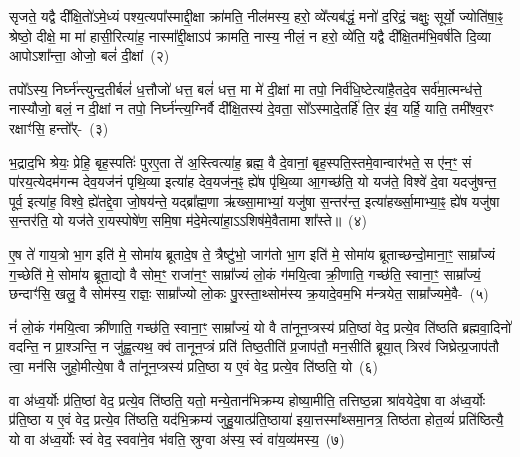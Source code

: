 सृजते॒ यद्वै दी᳚क्षि॒तो॑\-ऽमे॒ध्यं पश्य॒त्यपा᳚स्माद्दी॒क्षा क्रा॑मति॒ नील॑मस्य॒ हरो॒ व्ये᳚त्यब॑द्धं॒ मनो॑ द॒रिद्रं॒ चक्षुः॒ सूर्यो॒ ज्योति॑षा॒ꣴ॒ श्रेष्ठो॒ दीक्षे॒ मा मा॑ हासी॒रित्या॑ह॒ नास्मा᳚द्दी॒क्षा\-ऽप॑ क्रामति॒ नास्य॒ नीलं॒ न हरो॒ व्ये॑ति॒ यद्वै दी᳚क्षि॒तम॑भि॒वर्\mbox{}ष॑ति दि॒व्या आपो\-ऽशा᳚न्ता॒ ओजो॒ बलं॑ दी॒क्षां~(२)

तपो᳚\-ऽस्य॒ निर्घ्न॑न्त्युन्द॒तीर्बलं॑ ध॒त्तौजो॑ धत्त॒ बलं॑ धत्त॒ मा मे॑ दी॒क्षां मा तपो॒ निर्व॑धि॒ष्टेत्या॑है॒तदे॒व सर्व॑मा॒त्मन्ध॑त्ते॒ नास्यौजो॒ बलं॒ न दी॒क्षां न तपो॒ निर्घ्न॑न्त्य॒ग्निर्वै दी᳚क्षि॒तस्य॑ दे॒वता॒ सो᳚\-ऽस्मादे॒तर्\mbox{}हि॑ ति॒र इ॑व॒ यर्\mbox{}हि॒ याति॒ तमी᳚श्व॒रꣳ रक्षाꣳ॑सि॒ हन्तो᳚र्-~(३)

भ॒द्राद॒भि श्रेयः॒ प्रेहि॒ बृह॒स्पतिः॑ पुरए॒ता ते॑ अ॒स्त्वित्या॑ह॒ ब्रह्म॒ वै दे॒वानां॒ बृह॒स्पति॒स्तमे॒वान्वार॑भते॒ स ए॑न॒ꣳ॒ सं पा॑रय॒त्येदम॑गन्म देव॒यज॑नं पृथि॒व्या इत्या॑ह देव॒यज॑न॒ꣴ॒ ह्ये॑ष पृ॑थि॒व्या आ॒गच्छ॑ति॒ यो यज॑ते॒ विश्वे॑ दे॒वा यदजु॑षन्त॒ पूर्व॒ इत्या॑ह॒ विश्वे॒ ह्ये॑तद्दे॒वा जो॒षय॑न्ते॒ यद्ब्रा᳚ह्म॒णा ऋ॑ख्सा॒माभ्यां॒ यजु॑षा स॒न्तर॑न्त॒ इत्या॑हर्ख्सा॒माभ्या॒ꣴ॒ ह्ये॑ष यजु॑षा स॒न्तर॑ति॒ यो यज॑ते रा॒यस्पोषे॑ण॒ समि॒षा म॑दे॒मेत्या॑हा॒\-ऽऽ\-शिष॑मे॒वैतामा शा᳚स्ते॥~(४)

{\anuvakamend[{यज॑मानो दी॒क्षाꣳ हन्तो᳚र्ब्राह्म॒णाश्चतु॑र्विꣳशतिश्च}]}%

ए॒ष ते॑ गाय॒त्रो भा॒ग इति॑ मे॒ सोमा॑य ब्रूतादे॒ष ते॒ त्रैष्टु॑भो॒ जाग॑तो भा॒ग इति॑ मे॒ सोमा॑य ब्रूताच्छन्दो॒माना॒ꣳ॒ साम्रा᳚ज्यं ग॒च्छेति॑ मे॒ सोमा॑य ब्रूता॒द्यो वै सोम॒ꣳ॒ राजा॑न॒ꣳ॒ साम्रा᳚ज्यं लो॒कं ग॑मयि॒त्वा क्री॒णाति॒ गच्छ॑ति॒ स्वाना॒ꣳ॒ साम्रा᳚ज्यं॒ छन्दाꣳ॑सि॒ खलु॒ वै सोम॑स्य॒ राज्ञः॒ साम्रा᳚ज्यो लो॒कः पु॒रस्ता॒थ्सोम॑स्य क्र॒यादे॒वम॒भि म॑न्त्रयेत॒ साम्रा᳚ज्यमे॒वै-~(५)

नं॑ लो॒कं ग॑मयि॒त्वा क्री॑णाति॒ गच्छ॑ति॒ स्वाना॒ꣳ॒ साम्रा᳚ज्यं॒ यो वै ता॑नून॒प्त्रस्य॑ प्रति॒ष्ठां वेद॒ प्रत्ये॒व ति॑ष्ठति ब्रह्मवा॒दिनो॑ वदन्ति॒ न प्रा॒श्ञन्ति॒ न जु॑ह्व॒त्यथ॒ क्व॑ तानून॒प्त्रं प्रति॑ तिष्ठ॒तीति॑ प्र॒जा\-प॑तौ॒ मन॒सीति॑ ब्रूया॒त् त्रिरव॑ जिघ्रेत्प्र॒जा\-प॑तौ त्वा॒ मन॑सि जुहो॒मीत्ये॒षा वै ता॑नून॒प्त्रस्य॑ प्रति॒ष्ठा य ए॒वं वेद॒ प्रत्ये॒व ति॑ष्ठति॒ यो~(६)

वा अ॑ध्व॒र्योः प्र॑ति॒ष्ठां वेद॒ प्रत्ये॒व ति॑ष्ठति॒ यतो॒ मन्ये॒तान॑भिक्रम्य होष्या॒मीति॒ तत्तिष्ठ॒न्ना श्रा॑वयेदे॒षा वा अ॑ध्व॒र्योः प्र॑ति॒ष्ठा य ए॒वं वेद॒ प्रत्ये॒व ति॑ष्ठति॒ यद॑भि॒क्रम्य॑ जुहु॒यात्प्र॑ति॒ष्ठाया॑ इया॒त्तस्मा᳚थ्समा॒नत्र॒ तिष्ठ॑ता होत॒व्यं॑ प्रति॑ष्ठित्यै॒ यो वा अ॑ध्व॒र्योः स्वं वेद॒ स्ववा॑ने॒व भ॑वति॒ स्रुग्वा अ॑स्य॒ स्वं वा॑य॒व्य॑मस्य॒~(७)

